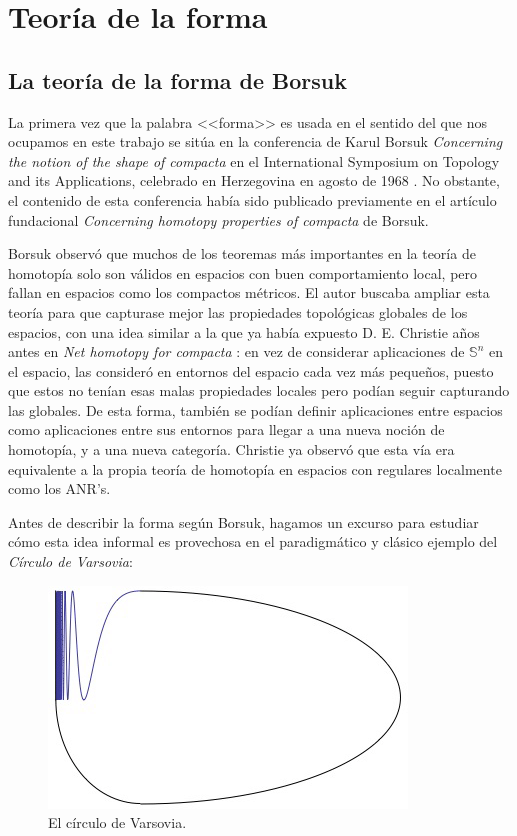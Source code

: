 \chapter{Teoría de la forma}\label{formahistorica}

\section{La teoría de la forma de Borsuk}

La primera vez que la palabra <<forma>> es usada en el sentido del que nos ocupamos en este trabajo se sitúa en la conferencia de Karul Borsuk \textit{Concerning the notion of the shape of compacta} en el International Symposium on Topology and its Applications, celebrado en Herzegovina en agosto de 1968 \cite{borsuk1969concerning}. No obstante, el contenido de esta conferencia había sido publicado previamente en el artículo fundacional \textit{Concerning homotopy properties of compacta} \cite{Borsuk_1968} de Borsuk.

Borsuk observó que muchos de los teoremas más importantes en la teoría de homotopía solo son válidos en espacios con buen comportamiento local, pero fallan en espacios como los compactos métricos. El autor buscaba ampliar esta teoría para que capturase mejor las propiedades topológicas globales de los espacios, con una idea similar a la que ya había expuesto D. E. Christie a\~nos antes en \textit{Net homotopy for compacta} \cite{christie1944net}: en vez de considerar aplicaciones de $ \mathbb{S}^n$ en el espacio, las consideró en entornos del espacio cada vez más peque\~nos, puesto que estos no tenían esas malas propiedades locales pero podían seguir capturando las globales. De esta forma, también se podían definir aplicaciones entre espacios como aplicaciones entre sus entornos para llegar a una nueva noción de homotopía, y a una nueva categoría. Christie ya observó que esta vía era equivalente a la propia teoría de homotopía en espacios con regulares localmente como los ANR's. 

Antes de describir la forma según Borsuk, hagamos un excurso para estudiar cómo esta idea informal es provechosa en el paradigmático y clásico ejemplo del \emph{Círculo de Varsovia}: 
\begin{figure}[h]
  \centering
  \includegraphics[scale = 0.8]{imagenes/Warsaw-circle.png}
  \caption{El círculo de Varsovia.}
  \label{circulovarsovia}
\end{figure}

